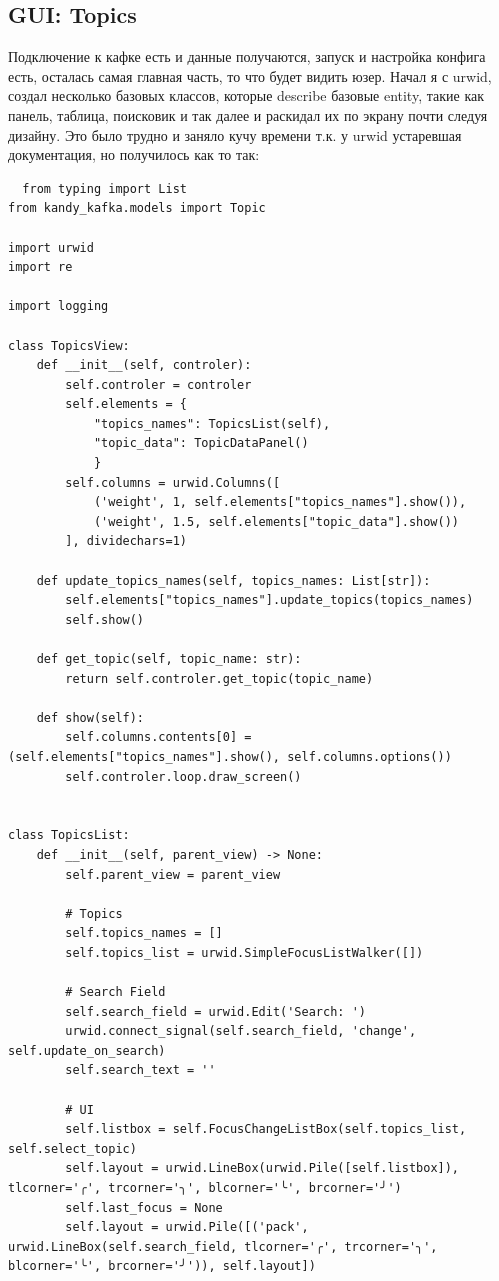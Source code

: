 \documentclass[10pt , a4paper]{report}
\newenvironment{code}{\captionsetup{type=listing}}{}
\begin{document}
\subsection{GUI: Topics}

Подключение к кафке есть и данные получаются, запуск и настройка конфига есть, осталась самая главная часть, то что будет видить юзер. Начал я с urwid, создал несколько базовых классов, которые describe базовые entity, такие как панель, таблица, поисковик и так далее и раскидал их по экрану почти следуя дизайну. Это было трудно и заняло кучу времени т.к. у urwid устаревшая документация, но получилось как то так:

\begin{code}
  \begin{verbatim}
  from typing import List
from kandy_kafka.models import Topic

import urwid
import re

import logging

class TopicsView:
    def __init__(self, controler):
        self.controler = controler
        self.elements = {
            "topics_names": TopicsList(self),
            "topic_data": TopicDataPanel()
            }
        self.columns = urwid.Columns([
            ('weight', 1, self.elements["topics_names"].show()),
            ('weight', 1.5, self.elements["topic_data"].show())
        ], dividechars=1)

    def update_topics_names(self, topics_names: List[str]):
        self.elements["topics_names"].update_topics(topics_names)
        self.show()

    def get_topic(self, topic_name: str):
        return self.controler.get_topic(topic_name)
    
    def show(self):
        self.columns.contents[0] = (self.elements["topics_names"].show(), self.columns.options())
        self.controler.loop.draw_screen()


class TopicsList:
    def __init__(self, parent_view) -> None:
        self.parent_view = parent_view
        
        # Topics
        self.topics_names = []
        self.topics_list = urwid.SimpleFocusListWalker([])
        
        # Search Field
        self.search_field = urwid.Edit('Search: ')
        urwid.connect_signal(self.search_field, 'change', self.update_on_search)
        self.search_text = ''
        
        # UI
        self.listbox = self.FocusChangeListBox(self.topics_list, self.select_topic)
        self.layout = urwid.LineBox(urwid.Pile([self.listbox]), tlcorner='╭', trcorner='╮', blcorner='╰', brcorner='╯')
        self.last_focus = None
        self.layout = urwid.Pile([('pack', urwid.LineBox(self.search_field, tlcorner='╭', trcorner='╮', blcorner='╰', brcorner='╯')), self.layout])


\end{verbatim}
\end{code}
\end{document}
